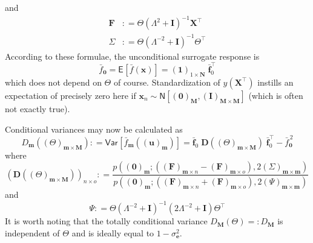 \documentclass[preprint,12pt]{elsarticle}
\newcommand*{\M}[1]{\ensuremath{#1}\xspace}
\newcommand*{\vr}[1]{\M{\mathbf{#1}}}
\newcommand*{\deq}{\M{\mathrel{\mathop:}=}}
\newcommand*{\deqr}{\M{=\mathrel{\mathop:}}}
\newcommand*{\ev}[2][]{\mathsf{E}_{#1}\!\left\lbrack{} #2 \right\rbrack}
\newcommand*{\var}[2][]{\mathsf{Var}_{#1}\!\left\lbrack{} #2 \right\rbrack}
\newcommand*{\gauss}[2]{\mathsf{N}\!\left\lbrack{} #1 , #2 \right\rbrack}
\begin{document}
            and
            \begin{align} \label{eq:Method:GSA:FbSigmaDef}
                \vr{F} &\deq 
                    \Theta \left(\Lambda^{2} + \vr{I}\right)^{-1} \vr{X}^{\intercal} \\
                \Sigma &\deq 
                    \Theta \left(\Lambda^{-2} + \vr{I}\right)^{-1} \Theta^{\intercal}
            \end{align}
            According to these formulae, the unconditional surrogate response is
            \begin{equation} \label{eq:Method:GSA:f_0}
                \bar{f}_{\vr{0}} = \ev{\bar{f}(\vr{x})} = (\vr{1})_{1\times\vr{N}}\;\bar{\vr{f}}_{0}^{\intercal}
            \end{equation}
            which does not depend on $\Theta$ of course. Standardization of $y(\vr{X}^{\intercal})$ instills an expectation of precisely zero here if $\vr{x}_{n} \sim \gauss{(\vr{0})_{\vr{M}}}{(\vr{I})_{\vr{M}\times\vr{M}}}$ (which is often not exactly true).

            Conditional variances may now be calculated as
            \begin{equation} \label{eq:Method:GSA:DmDef}
                D_{\vr{m}}((\Theta)_{\vr{m}\times\vr{M}}) \deq \var{\bar{f}_{\vr{m}}((\vr{u})_{\vr{m}})}
                = \bar{\vr{f}}_{0} \; \vr{D}((\Theta)_{\vr{m}\times\vr{M}}) \; \bar{\vr{f}}_{0}^{\intercal} - \bar{f}_{\vr{0}}^{\,2}
            \end{equation}
            where
            \begin{equation} \label{eq:Method:GSA:DDef}
                (\vr{D}((\Theta)_{\vr{m}\times\vr{M}}))_{n \times o} \deq
                \frac 
                {p\!\left((\vr{0})_{\vr{m}} ; \left((\vr{F})_{\vr{m}\times n}-(\vr{F})_{\vr{m}\times o}\right), 2(\Sigma)_{\vr{m}\times\vr{m}}\right)}
                {p\!\left((\vr{0})_{\vr{m}} ; \left((\vr{F})_{\vr{m}\times n}+(\vr{F})_{\vr{m}\times o}\right), 2(\Psi)_{\vr{m}\times\vr{m}}\right)}
            \end{equation}
            and
            \begin{equation} \label{eq:Method:GSA:PsiDef}
                \Psi \deq \Theta \left(\Lambda^{-2}+\vr{I}\right)^{-1}\left(2\Lambda^{-2}+\vr{I}\right) 
                \Theta^{\intercal}
            \end{equation}
            It is worth noting that the totally conditional variance $D_{\vr{M}}(\Theta) \deqr D_{\vr{M}}$ is independent of $\Theta$ and is ideally equal to $1-\sigma_{\vr{e}}^{2}$.
\end{document}
